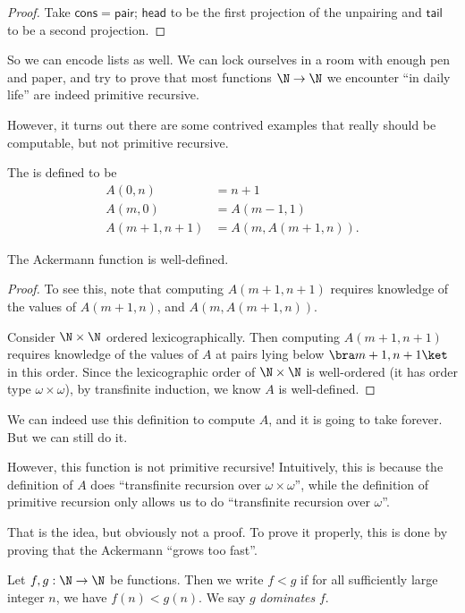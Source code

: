 \documentclass[a4paper]{article}
\newcommand\head{\mathsf{head}}
\newcommand\tail{\mathsf{tail}}
\newcommand\pair{\mathsf{pair}}
\newcommand\cons{\mathsf{cons}}
\begin{document}
\begin{proof}
  Take $\cons = \pair$; $\head$ to be the first projection of the unpairing and $\tail$ to be a second projection.
\end{proof}

So we can encode lists as well. We can lock ourselves in a room with enough pen and paper, and try to prove that most functions $\N \to \N$ we encounter ``in daily life'' are indeed primitive recursive.

However, it turns out there are some contrived examples that really should be computable, but not primitive recursive.

\begin{defi}
  The  is defined to be
  \begin{align*}
    A(0, n) &= n + 1\\
    A(m, 0) &= A(m -1, 1)\\
    A(m + 1, n + 1) &= A(m, A(m + 1, n)).
  \end{align*}
\end{defi}

\begin{prop}
  The Ackermann function is well-defined.
\end{prop}

\begin{proof}
  To see this, note that computing $A(m + 1, n + 1)$ requires knowledge of the values of $A(m + 1, n)$, and $A(m, A(m + 1, n))$.

  Consider $\N \times \N$ ordered lexicographically. Then computing $A(m + 1, n + 1)$ requires knowledge of the values of $A$ at pairs lying below $\bra m + 1, n + 1\ket$ in this order. Since the lexicographic order of $\N \times \N$ is well-ordered (it has order type $\omega \times \omega$), by transfinite induction, we know $A$ is well-defined.
\end{proof}
We can indeed use this definition to compute $A$, and it is going to take forever. But we can still do it.

However, this function is not primitive recursive! Intuitively, this is because the definition of $A$ does ``transfinite recursion over $\omega \times \omega$'', while the definition of primitive recursion only allows us to do ``transfinite recursion over $\omega$''.

That is the idea, but obviously not a proof. To prove it properly, this is done by proving that the Ackermann ``grows too fast''.
\begin{defi}\index{$<$}
  Let $f, g: \N \to \N$ be functions. Then we write $f < g$ if for all sufficiently large integer $n$, we have $f(n) < g(n)$. We say $g$ \emph{dominates} $f$.
\end{defi}
\end{document}
